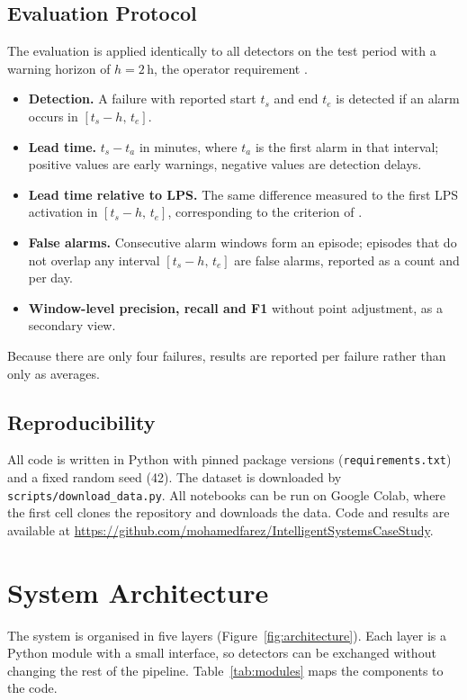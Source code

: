 \subsection{Evaluation Protocol}
\label{sec:evaluation}
The evaluation is applied identically to all detectors on the test period with a warning horizon of $h=2$\,h, the operator requirement \citep{veloso2022metropt}.
\begin{itemize}[itemsep=2pt]
  \item \textbf{Detection.} A failure with reported start $t_s$ and end $t_e$ is detected if an alarm occurs in $[t_s-h,\,t_e]$.
  \item \textbf{Lead time.} $t_s - t_a$ in minutes, where $t_a$ is the first alarm in that interval; positive values are early warnings, negative values are detection delays.
  \item \textbf{Lead time relative to LPS.} The same difference measured to the first LPS activation in $[t_s-h,\,t_e]$, corresponding to the criterion of \citet{silva2023adversarial}.
  \item \textbf{False alarms.} Consecutive alarm windows form an episode; episodes that do not overlap any interval $[t_s-h,\,t_e]$ are false alarms, reported as a count and per day.
  \item \textbf{Window-level precision, recall and F1} without point adjustment, as a secondary view.
\end{itemize}
Because there are only four failures, results are reported per failure rather than only as averages.

\subsection{Reproducibility}
All code is written in Python with pinned package versions (\texttt{requirements.txt}) and a fixed random seed (42). The dataset is downloaded by \texttt{scripts/download\_data.py}. All notebooks can be run on Google Colab, where the first cell clones the repository and downloads the data. Code and results are available at \url{https://github.com/mohamedfarez/IntelligentSystemsCaseStudy}.

\section{System Architecture}
\label{sec:architecture}
The system is organised in five layers (Figure~\ref{fig:architecture}). Each layer is a Python module with a small interface, so detectors can be exchanged without changing the rest of the pipeline. Table~\ref{tab:modules} maps the components to the code.

